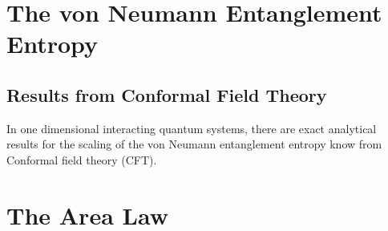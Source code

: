 \section{The von Neumann Entanglement Entropy}
\subsection{Results from Conformal Field Theory}
In one dimensional interacting quantum systems, there are exact analytical results for the scaling of the von Neumann entanglement entropy know from Conformal field theory (CFT).


\section{The Area Law}
